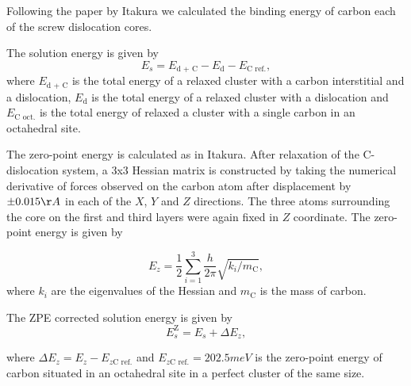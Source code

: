\documentclass[a4paper]{article}
\begin{document}
{Following the paper by Itakura
\cite{itakura13_effec_hydrog_atoms_screw_disloc} we calculated the
binding energy of carbon each of the screw dislocation cores. 

The solution energy is given by 
\[ E_s = E_{\text{d + C}} - E_{\text{d}} - E_{\text{C ref.}}, \]
where \(E_{\text{d + C}}\) is the total energy of a relaxed cluster with a
carbon interstitial and a dislocation, \(E_{\text{d}}\) is the total
energy of a relaxed cluster with a dislocation and \(E_{\text{C
    oct.}}\) is the total energy of relaxed a cluster with a single carbon in
an octahedral site.

The zero-point energy is calculated as in Itakura. After relaxation of the
C-dislocation system, a 3x3 Hessian matrix is constructed by taking the
numerical derivative of forces observed on the carbon atom after
displacement by \(\pm 0.015 \AA\) in each of the \(X\), \(Y\) and \(Z\) directions.
The three atoms surrounding the core on the first and third layers were
again fixed in \(Z\) coordinate. The zero-point energy is
given by

\[ E_z = \frac{1}{2} \sum_{i=1}^3 \frac{h}{2\pi} \sqrt{ k_i /
    m_{\text{C}} },  \]
where \(k_i\) are the eigenvalues of the Hessian and \(m_\text{C}\) is
the mass of carbon. 

The ZPE corrected solution energy is given by 
\[ E^{\text{Z}}_{s} = E_s + \Delta E_z,  \]

where \(\Delta E_z = E_z - E_{z\text{C ref.}}\) and \(E_{z\text{C ref.}} = 202.5 meV\) is the zero-point energy of carbon
situated in an octahedral site in a perfect cluster of the same size. 


}
\end{document}
